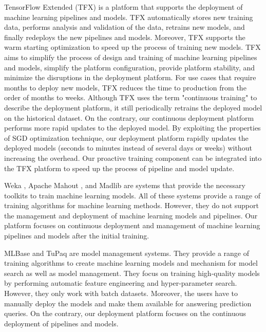 TensorFlow Extended (TFX) is a platform that supports the deployment of machine learning pipelines and models.
TFX automatically stores new training data, performs analysis and validation of the data, retrains new models, and finally redeploys the new pipelines and models. 
Moreover, TFX supports the warm starting optimization to speed up the process of training new models.
TFX aims to simplify the process of design and training of machine learning pipelines and models, simplify the platform configuration, provide platform stability, and minimize the disruptions in the deployment platform.
For use cases that require months to deploy new models, TFX reduces the time to production from the order of months to weeks.
Although TFX uses the term "continuous training" to describe the deployment platform, it still periodically retrains the deployed model on the historical dataset.
On the contrary, our continuous deployment platform performs more rapid updates to the deployed model.
By exploiting the properties of SGD optimization technique, our deployment platform rapidly updates the deployed models (seconds to minutes instead of several days or weeks) without increasing the overhead.
Our proactive training component can be integrated into the TFX platform to speed up the process of pipeline and model update.

Weka \cite{hall2009weka}, Apache Mahout \cite{Owen:2011:MA:2132656}, and Madlib \cite{hellerstein2012madlib} are systems that provide the necessary toolkits to train machine learning models. 
All of these systems provide a range of training algorithms for machine learning methods. 
However, they do not support the management and deployment of machine learning models and pipelines. 
Our platform focuses on continuous deployment and management of machine learning pipelines and models after the initial training.

MLBase \cite{kraska2013mlbase} and TuPaq \cite{sparks2015tupaq} are model management systems.
They provide a range of training algorithms to create machine learning models and mechanism for model search as well as model management.
They focus on training high-quality models by performing automatic feature engineering and hyper-parameter search.
However, they only work with batch datasets.
Moreover, the users have to manually deploy the models and make them available for answering prediction queries.
On the contrary, our deployment platform focuses on the continuous deployment of pipelines and models.
